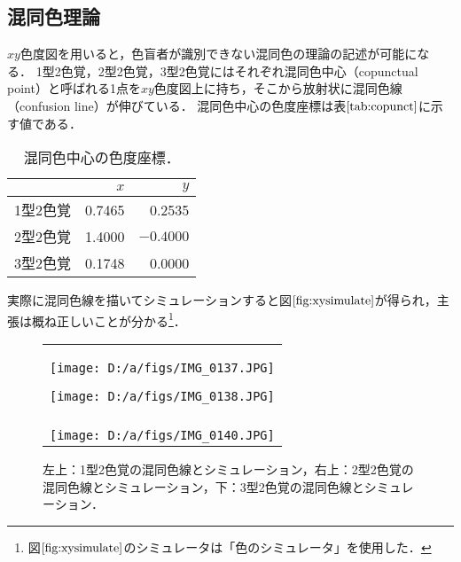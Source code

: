 \documentclass[uplatex,paper=a4,fontsize=4.0truemm,jafontsize=4.0truemm,head_space=30.0truemm,foot_space=30.0truemm,baselineskip=8.0truemm,line_length=40zw,gutter=25.0truemm,oneside,openany,fleqn,hanging_panctuation,open_bracket_pos=nibu_tentsuki,dvipdfmx,jis2004,book,titlepage]{jlreq}
\theoremstyle{mystyle}
\newcommand{\captiondot}[1]{\caption{#1．}}
\newcommand{\tableinput}[4]{\begin{table}[tbp]\centering\captiondot{#3}\label{tab:#4}\begin{tabular}{#1}#2\end{tabular}\end{table}}
\newcommand{\mathdisplaystyle}[1]{\(\displaystyle{#1}\)}
\newcommand{\Reference}[1]{\mathdisplaystyle{\ref{#1}}}
\newcommand{\negativevalue}[1]{{-#1}}
\begin{document}
			\subsection{混同色理論}
				\mathdisplaystyle{xy}色度図を用いると，色盲者が識別できない混同色の理論の記述が可能になる．
				1型2色覚，2型2色覚，3型2色覚にはそれぞれ混同色中心（copunctual point）と呼ばれる1点を\mathdisplaystyle{xy}色度図上に持ち，そこから放射状に混同色線（confusion line）が伸びている．
				混同色中心の色度座標は表\Reference{tab:copunct}に示す値である\cite[Table 1]{Fomins2011}．
				\tableinput{l|rr}{ & \(x\) & \(y\) \\ \hline
					1型2色覚 & 0.7465 & 0.2535 \\
					2型2色覚 & 1.4000 & \mathdisplaystyle{\negativevalue{0.4000}} \\
					3型2色覚 & 0.1748 & 0.0000}{混同色中心の色度座標}{copunct}
				実際に混同色線を描いてシミュレーションすると図\Reference{fig:xysimulate}が得られ，主張は概ね正しいことが分かる\footnote{図\Reference{fig:xysimulate}のシミュレータは「色のシミュレータ」を使用した．}．
				\begin{figure}[tbp]
					\centering
					\begin{tabular}{c}
						\begin{minipage}{0.5\linewidth}
							\centering
							\texttt{[image: D:/a/figs/IMG\_0137.JPG]}
						\end{minipage}
						\begin{minipage}{0.5\linewidth}
							\centering
							\texttt{[image: D:/a/figs/IMG\_0138.JPG]}
						\end{minipage} \\
						\begin{minipage}{0.06\linewidth}
							\vspace{10truemm}
						\end{minipage} \\
						\begin{minipage}{0.5\linewidth}
							\centering
							\texttt{[image: D:/a/figs/IMG\_0140.JPG]}
						\end{minipage}
						\begin{minipage}{0.5\linewidth}
							\vspace{10truemm}
						\end{minipage}
					\end{tabular}
					\captiondot{左上：1型2色覚の混同色線とシミュレーション，右上：2型2色覚の混同色線とシミュレーション，下：3型2色覚の混同色線とシミュレーション}\label{fig:xysimulate}
				\end{figure}
\end{document}
